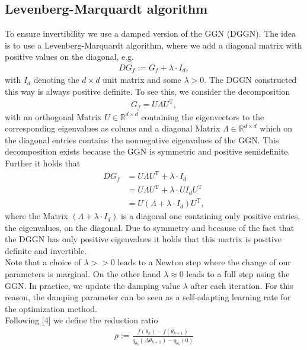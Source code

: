 \documentclass[conference]{IEEEtran}
\begin{document}
	\subsection{Levenberg-Marquardt algorithm }
	\noindent
	To ensure invertibility we use a damped version of the GGN (DGGN). The idea is to use a Levenberg-Marquardt algorithm, where we add a diagonal matrix with positive values on the diagonal, e.g.
	\begin{align}
	DG_{f} := G_{f} + \lambda\cdot I_{d},
	\end{align}
	with $I_{d}$ denoting the $d\times d$ unit matrix and some $\lambda>0$.
	The DGGN constructed this way is always positive definite. 
	To see this, we consider the decomposition
	\begin{align}
	G_{f} = U\Lambda U^{\mathrm{T}},
	\end{align}
	with an orthogonal Matrix $U\in\mathbb{R}^{d\times d}$ containing the eigenvectors to the corresponding eigenvalues as colums and a diagonal Matrix $\Lambda\in\mathbb{R}^{d\times d}$ which on the diagonal entries contains the nonnegative eigenvalues of the GGN. This decomposition exists because the GGN is symmetric and positive semidefinite. Further it holds that
	\begin{align}
	DG_{f} &= U\Lambda U^{\mathrm{T}} + \lambda\cdot I_{d}\\
	&= U\Lambda U^{\mathrm{T}} + \lambda\cdot U I_{d}U^{\mathrm{T}}\\
	&= U\left(\Lambda + \lambda\cdot I_{d}\right)U^{\mathrm{T}},
	\end{align}
	where the Matrix $\left(\Lambda + \lambda\cdot I_{d}\right)$ is a diagonal one containing only positive entries, the eigenvalues, on the diagonal. Due to symmetry and because of the fact that the DGGN has only positive eigenvalues it holds that this matrix is positive definite and invertible.\\
	Note that a choice of $\lambda>>0$ leads to a Newton step where the change of our parameters is marginal. On the other hand $\lambda\approx 0$ leads to a full step using the GGN. In practice, we update the damping value $\lambda$ after each iteration. For this reason, the damping parameter can be seen as a self-adapting learning rate for the optimization method.\\
	Following [4] we define the reduction ratio
	\begin{align}
	\rho := \frac{f(\theta_{k}) - f(\theta_{k+1})}{q_{\theta_{k}}(\Delta\theta_{k + 1}) - q_{\theta_{k}}(0)}
	\end{align}
\end{document}
